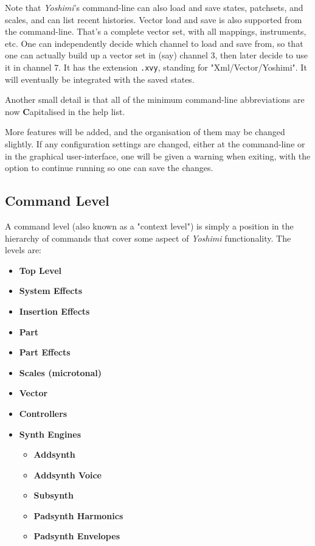   Note that \textsl{Yoshimi}'s command-line can also load and save states,
   patchsets, and scales, and can list recent histories.
   Vector load and save is also supported from the command-line.
   That's a complete vector set, with all mappings, instruments, etc.
   One can independently decide which
   channel to load and save from, so that one
   can actually build up a vector set in
   (say) channel 3, then later decide to use it in channel 7.
   It has the extension \texttt{.xvy}, standing for "Xml/Vector/Yoshimi".
   It will eventually be integrated with the saved states.

   Another small detail is that all of the minimum command-line
   abbreviations are now \textbf{C}apitalised in the help list.

   More features will be added, and the organisation of them may be changed
   slightly.  If any configuration settings are changed, either at the
   command-line or in the graphical user-interface, one will be given a warning
   when exiting, with the option to continue running so one can save the
   changes.

\subsection{Command Level}
\label{subsec:command_line_command_level}

   A command level (also known as a "context level")
   is simply a position in the hierarchy of commands that cover
   some aspect of \textsl{Yoshimi} functionality.
   The levels are:

   \begin{itemize}
      \item \textbf{Top Level}
      \item \textbf{System Effects}
      \item \textbf{Insertion Effects}
      \item \textbf{Part}
      \item \textbf{Part Effects}
      \item \textbf{Scales (microtonal)}
      \item \textbf{Vector}
      \item \textbf{Controllers}
      \item \textbf{Synth Engines}
      \begin{itemize}
         \item \textbf{Addsynth}
         \item \textbf{Addsynth Voice}
         \item \textbf{Subsynth}
         \item \textbf{Padsynth Harmonics}
         \item \textbf{Padsynth Envelopes}
      \end{itemize}
   \end{itemize}

